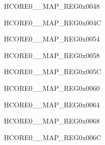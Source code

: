 \begin{register}{H}{CORE0\_\_MAP\_REG}{0x0048}\label{regdesc:CORE0LPSWINTMAPREG}
\end{register}\vspace{-3em}


\begin{register}{H}{CORE0\_\_MAP\_REG}{0x004C}\label{regdesc:CORE0LPSYSREGINTMAPREG}
\end{register}\vspace{-3em}



\begin{register}{H}{CORE0\_\_MAP\_REG}{0x0054}\label{regdesc:CORE0SYSICMINTMAPREG}
\end{register}\vspace{-3em}


\begin{register}{H}{CORE0\_\_MAP\_REG}{0x0058}\label{regdesc:CORE0USBDEVICEINTMAPREG}
\end{register}\vspace{-3em}


\begin{register}{H}{CORE0\_\_MAP\_REG}{0x005C}\label{regdesc:CORE0SDIOHOSTINTMAPREG}
\end{register}\vspace{-3em}


\begin{register}{H}{CORE0\_\_MAP\_REG}{0x0060}\label{regdesc:CORE0AXIDMACINTMAPREG}
\end{register}\vspace{-3em}


\begin{register}{H}{CORE0\_\_MAP\_REG}{0x0064}\label{regdesc:CORE0SPI2INTMAPREG}
\end{register}\vspace{-3em}


\begin{register}{H}{CORE0\_\_MAP\_REG}{0x0068}\label{regdesc:CORE0SPI3INTMAPREG}
\end{register}\vspace{-3em}


\begin{register}{H}{CORE0\_\_MAP\_REG}{0x006C}\label{regdesc:CORE0I2S0INTMAPREG}
\end{register}\vspace{-3em}


